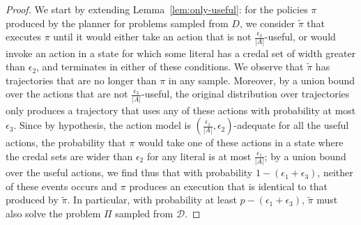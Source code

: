 \documentclass[letterpaper]{article} %
\begin{document}
\begin{proof}
We start by extending Lemma~\ref{lem:only-useful}: for the policies $\pi$ produced by the planner for problems sampled from $D$, we consider $\tilde{\pi}$ that executes $\pi$ until it would either take an action that is not $\frac{\epsilon_3}{|A|}$-useful, or would invoke an action in a state for which some literal has a credal set of width greater than $\epsilon_2$, and terminates in either of these conditions. We observe that $\tilde{\pi}$ has trajectories that
are no longer than $\pi$ in any sample. Moreover, by a union bound over the actions that are not $\frac{\epsilon_3}{|A|}$-useful, the original distribution over trajectories only produces a trajectory that uses any of these actions with probability at most $\epsilon_3$. Since by hypothesis, the action model is $(\frac{\epsilon_1}{|A|},\epsilon_2)$-adequate for all the useful actions, the probability that $\pi$ would take one of these actions in a state where the credal sets are wider than $\epsilon_2$ for any literal is at most $\frac{\epsilon_1}{|A|}$; by a union bound over the useful actions, we find thus that with probability $1-(\epsilon_1+\epsilon_3)$, neither of these events occurs and $\pi$ produces an execution that is identical to that produced by $\tilde{\pi}$. In particular, with probability at least $p-(\epsilon_1+\epsilon_3)$, $\tilde{\pi}$ must also solve the problem $\Pi$ sampled from $\mathcal{D}$.


\end{proof}
\end{document}
